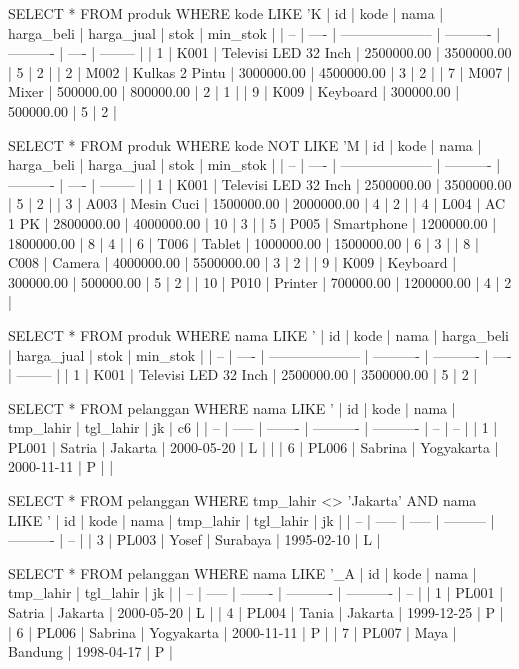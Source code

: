 SELECT * FROM produk WHERE kode LIKE 'K%
| id | kode | nama                 | harga_beli | harga_jual | stok | min_stok |
| -- | ---- | -------------------- | ---------- | ---------- | ---- | -------- |
| 1  | K001 | Televisi LED 32 Inch | 2500000.00 | 3500000.00 | 5    | 2        |
| 2  | M002 | Kulkas 2 Pintu       | 3000000.00 | 4500000.00 | 3    | 2        |
| 7  | M007 | Mixer                | 500000.00  | 800000.00  | 2    | 1        |
| 9  | K009 | Keyboard             | 300000.00  | 500000.00  | 5    | 2        |

SELECT * FROM produk WHERE kode NOT LIKE 'M%
| id | kode | nama                 | harga_beli | harga_jual | stok | min_stok |
| -- | ---- | -------------------- | ---------- | ---------- | ---- | -------- |
| 1  | K001 | Televisi LED 32 Inch | 2500000.00 | 3500000.00 | 5    | 2        |
| 3  | A003 | Mesin Cuci           | 1500000.00 | 2000000.00 | 4    | 2        |
| 4  | L004 | AC 1 PK              | 2800000.00 | 4000000.00 | 10   | 3        |
| 5  | P005 | Smartphone           | 1200000.00 | 1800000.00 | 8    | 4        |
| 6  | T006 | Tablet               | 1000000.00 | 1500000.00 | 6    | 3        |
| 8  | C008 | Camera               | 4000000.00 | 5500000.00 | 3    | 2        |
| 9  | K009 | Keyboard             | 300000.00  | 500000.00  | 5    | 2        |
| 10 | P010 | Printer              | 700000.00  | 1200000.00 | 4    | 2        |

SELECT * FROM produk WHERE nama LIKE '%
| id | kode | nama                 | harga_beli | harga_jual | stok | min_stok |
| -- | ---- | -------------------- | ---------- | ---------- | ---- | -------- |
| 1  | K001 | Televisi LED 32 Inch | 2500000.00 | 3500000.00 | 5    | 2        |

SELECT * FROM pelanggan WHERE nama LIKE '%
| id | kode  | nama    | tmp_lahir  | tgl_lahir  | jk | c6 |
| -- | ----- | ------- | ---------- | ---------- | -- | -- |
| 1  | PL001 | Satria  | Jakarta    | 2000-05-20 | L  |    |
| 6  | PL006 | Sabrina | Yogyakarta | 2000-11-11 | P  |    |

SELECT * FROM pelanggan WHERE tmp_lahir <> 'Jakarta' AND nama LIKE '%
| id | kode  | nama  | tmp_lahir | tgl_lahir  | jk |
| -- | ----- | ----- | --------- | ---------- | -- |
| 3  | PL003 | Yosef | Surabaya  | 1995-02-10 | L  |

SELECT * FROM pelanggan WHERE nama LIKE '_A%
| id | kode  | nama    | tmp_lahir  | tgl_lahir  | jk |
| -- | ----- | ------- | ---------- | ---------- | -- |
| 1  | PL001 | Satria  | Jakarta    | 2000-05-20 | L  |
| 4  | PL004 | Tania   | Jakarta    | 1999-12-25 | P  |
| 6  | PL006 | Sabrina | Yogyakarta | 2000-11-11 | P  |
| 7  | PL007 | Maya    | Bandung    | 1998-04-17 | P  |
